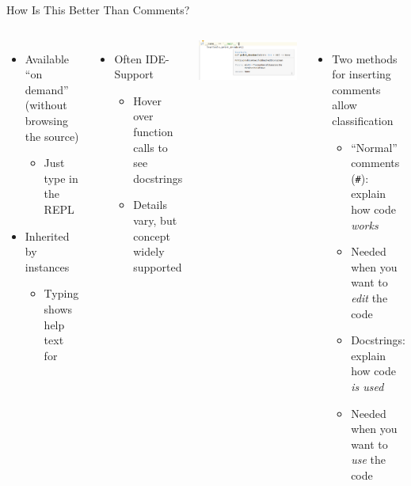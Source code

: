 \begin{frame}{How Is This Better Than Comments?}
%
\begin{columns}[T]
\begin{itemize}
\item Available \enquote{on demand} (without browsing the source)
	\begin{itemize}
	\item Just type  in the REPL
	\end{itemize}
\item Inherited by instances
	\begin{itemize}
	\item Typing  shows help text for 
	\end{itemize}
\end{itemize}
%
\begin{itemize}
\item Often IDE-Support
	\begin{itemize}
	\item Hover over function calls to see docstrings
	\item Details vary, but concept widely supported
	\end{itemize}
\end{itemize}
\includegraphics[width=\linewidth]{./gfx/07-helptext-mouseover}
%
\begin{itemize}
\item Two methods for inserting comments allow classification
	\begin{itemize}
	\item \enquote{Normal} comments (\texttt{\#}): explain how code \emph{works}
	\item[\Thus] Needed when you want to \emph{edit} the code
	\item Docstrings: explain how code \emph{is used}
	\item[\Thus] Needed when you want to \emph{use} the code
	\end{itemize}
\end{itemize}
\end{columns}
%
\end{frame}

